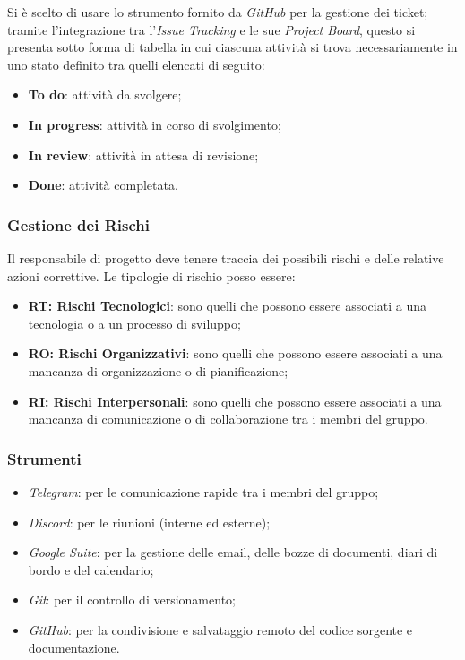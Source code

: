         Si è scelto di usare lo strumento fornito da \textit{GitHub} per la gestione dei ticket; tramite l'integrazione tra l'\textit{Issue Tracking} e le sue \textit{Project Board}, questo si presenta sotto forma di tabella in cui ciascuna attività si trova necessariamente in uno stato definito tra quelli elencati di seguito:
        \begin{itemize}
            \item \textbf{To do}: attività da svolgere;
            \item \textbf{In progress}: attività in corso di svolgimento;
            \item \textbf{In review}: attività in attesa di revisione;
            \item \textbf{Done}: attività completata.
        \end{itemize}

        \subsubsection{Gestione dei Rischi} 
        Il responsabile di progetto deve tenere traccia dei possibili rischi e delle relative azioni correttive.
        Le tipologie di rischio posso essere:
        \begin{itemize}
            \item \textbf{RT: Rischi Tecnologici}: sono quelli che possono essere associati a una tecnologia o a un processo di sviluppo;
            \item \textbf{RO: Rischi Organizzativi}: sono quelli che possono essere associati a una mancanza di organizzazione o di pianificazione;
            \item \textbf{RI: Rischi Interpersonali}: sono quelli che possono essere associati a una mancanza di comunicazione o di collaborazione tra i membri del gruppo.
        \end{itemize}
        \subsubsection{Strumenti}
            \begin{itemize}
                \item \textit{Telegram}: per le comunicazione rapide tra i membri del gruppo;
                \item \textit{Discord}: per le riunioni (interne ed esterne);
                \item \textit{Google Suite}: per la gestione delle email, delle bozze di documenti, diari di bordo e del calendario;
                \item \textit{Git}: per il controllo di versionamento;
                \item \textit{GitHub}: per la condivisione e salvataggio remoto del codice sorgente e documentazione.
            \end{itemize}
            
